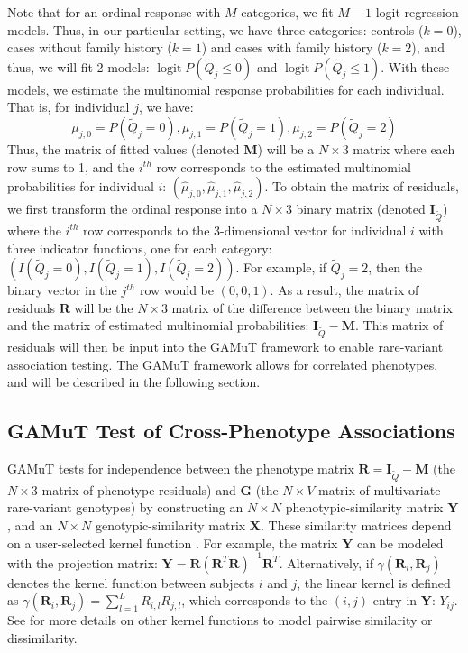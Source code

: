 \documentclass[]{article}
\DeclareMathOperator{\logit}{logit}
\theoremstyle{definition}
\theoremstyle{definition}
\theoremstyle{definition}
\theoremstyle{remark}
\begin{document}
Note that for an ordinal response with \(M\) categories, we fit \(M-1\)
logit regression models. Thus, in our particular setting, we have three
categories: controls (\(k=0\)), cases without family history (\(k=1\))
and cases with family history (\(k=2\)), and thus, we will fit 2 models:
\(\logit P(\tilde{Q}_j \leq 0)\) and \(\logit P(\tilde{Q}_j \leq 1)\).
With these models, we estimate the multinomial response probabilities
for each individual. That is, for individual \(j\), we have: \[
\mu_{j,0} = P(\tilde{Q}_j=0),
\mu_{j,1} = P(\tilde{Q}_j=1),
\mu_{j,2} = P(\tilde{Q}_j=2)
\] Thus, the matrix of fitted values (denoted \(\mathbf{M}\)) will be a
\(N \times 3\) matrix where each row sums to 1, and the \(i^{th}\) row
corresponds to the estimated multinomial probabilities for individual
\(i\): \((\hat{\mu}_{j,0},\hat{\mu}_{j,1},\hat{\mu}_{j,2})\). To obtain
the matrix of residuals, we first transform the ordinal response into a
\(N \times 3\) binary matrix (denoted \(\mathbf{I}_{\tilde{Q}}\)) where
the \(i^{th}\) row corresponds to the 3-dimensional vector for
individual \(i\) with three indicator functions, one for each category:
\((I(\tilde{Q}_j=0), I(\tilde{Q}_j=1), I(\tilde{Q}_j=2))\). For example,
if \(\tilde{Q}_j=2\), then the binary vector in the \(j^{th}\) row would
be \((0,0,1)\). As a result, the matrix of residuals \(\mathbf{R}\) will
be the \(N \times 3\) matrix of the difference between the binary matrix
and the matrix of estimated multinomial probabilities:
\(\mathbf{I}_{\tilde{Q}}-\mathbf{M}\). This matrix of residuals will
then be input into the GAMuT framework to enable rare-variant
association testing. The GAMuT framework allows for correlated
phenotypes, and will be described in the following section.

\hypertarget{gamut-test-of-cross-phenotype-associations}{%
\subsection{GAMuT Test of Cross-Phenotype
Associations}\label{gamut-test-of-cross-phenotype-associations}}

GAMuT tests for independence between the phenotype matrix
\(\mathbf{R}=\mathbf{I}_{\tilde{Q}}-\mathbf{M}\) (the \(N \times 3\)
matrix of phenotype residuals) and \(\mathbf{G}\) (the \(N \times V\)
matrix of multivariate rare-variant genotypes) by constructing an
\(N \times N\) phenotypic-similarity matrix \(\mathbf{Y}\), and an
\(N \times N\) genotypic-similarity matrix \(\mathbf{X}\). These
similarity matrices depend on a user-selected kernel function
\citep{Kwee2008, Schaid2010, Wu2010, Wu2011}. For example, the matrix
\(\mathbf{Y}\) can be modeled with the projection matrix:
\(\mathbf{Y} = \mathbf{R} (\mathbf{R}^T\mathbf{R})^{-1}\mathbf{R}^T\).
Alternatively, if \(\gamma(\mathbf{R}_i,\mathbf{R}_j)\) denotes the
kernel function between subjects \(i\) and \(j\), the linear kernel is
defined as
\(\gamma(\mathbf{R}_i,\mathbf{R}_j)= \sum_{l=1}^L R_{i,l} R_{j,l}\),
which corresponds to the \((i,j)\) entry in \(\mathbf{Y}\): \(Y_{ij}\).
See \citet{Broadaway2016} for more details on other kernel functions to
model pairwise similarity or dissimilarity.
\end{document}
